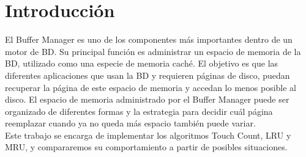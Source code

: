 \section{Introducción}

El Buffer Manager es uno de los componentes más importantes dentro de un
motor de BD. Su principal función es administrar un espacio de memoria de la BD,
utilizado como una especie de memoria caché. El objetivo es que las diferentes
aplicaciones que usan la BD y requieren páginas de disco, puedan recuperar la página de
este espacio de memoria y accedan lo menos posible al disco.
El espacio de memoria administrado por el Buffer Manager puede ser organizado de
diferentes formas y la estrategia para decidir cuál página reemplazar cuando ya no queda
más espacio también puede variar.\\


Este trabajo se encarga de implementar los algoritmos Touch Count, LRU y MRU, y compararemos su comportamiento 
a partir de posibles situaciones.
